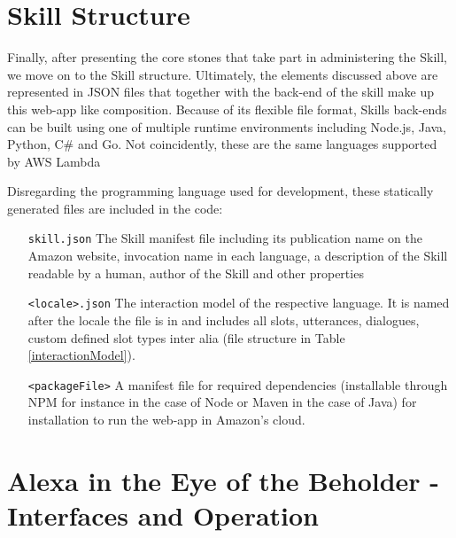 	


\section{Skill Structure}


Finally, after presenting the core stones that take part in administering the Skill, we move on to the Skill structure. Ultimately, the elements discussed above are represented in JSON files that together with the back-end of the skill make up this web-app like composition. Because of its flexible file format, Skills back-ends can be built using one of multiple runtime environments including Node.js, Java, Python, C\# and Go. 
Not coincidently, these are the same languages supported by AWS Lambda %

Disregarding the programming language used for development, these statically generated files are included in the code:

\begin{itemize}

\item[\texttt{skill.json}] The Skill manifest file including its publication name on the Amazon website, invocation name in each language, a description of the Skill readable by a human, author of the Skill and other properties

\item[\texttt{<locale>.json}] The interaction model of the respective language. It is named after the locale the file is in and includes all slots, utterances, dialogues, custom defined slot types inter alia (file structure in Table \ref{interactionModel}).

\item[\texttt{<packageFile>}] A manifest file for required dependencies (installable through NPM for instance in the case of Node or Maven in the case of Java) for installation to run the web-app in Amazon's cloud.

\end{itemize}



\section[Alexa in the Eye of the Beholder]{Alexa in the Eye of the Beholder - \\Interfaces and Operation}

